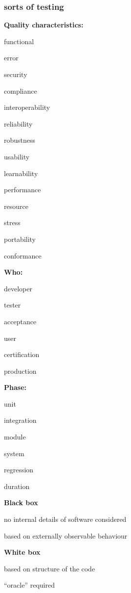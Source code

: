 \subsubsection{sorts of testing}

\textbf{Quality characteristics:}
\begin{itemize*}
	\item functional
	\item error
	\item security
	\item compliance
	\item interoperability
	\item reliability
	\item robustness
	\item usability
	\item learnability
	\item performance
	\item resource
	\item stress
	\item portability
	\item conformance
\end{itemize*}

\textbf{Who:}
\begin{itemize*}
	\item developer
	\item tester
	\item acceptance
	\item user
	\item certification
	\item production
\end{itemize*}

\textbf{Phase:}
\begin{itemize*}
	\item unit
	\item integration
	\item module
	\item system
	\item regression
	\item duration
\end{itemize*}

\textbf{Black box}
\begin{itemize*}
	\item no internal details of software considered
	\item based on externally observable behaviour
\end{itemize*}

\textbf{White box}
\begin{itemize*}
	\item based on structure of the code
	\item “oracle” required
\end{itemize*}

